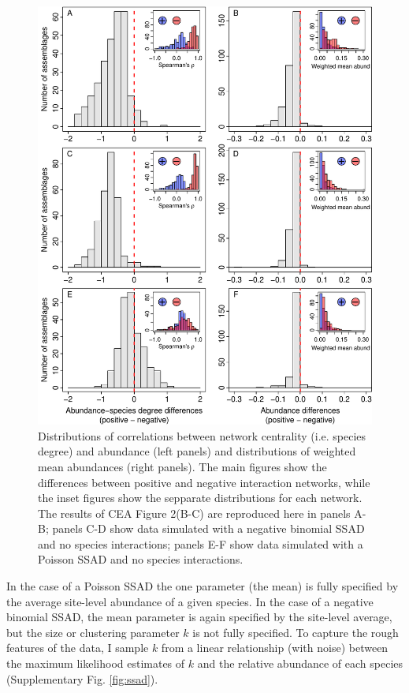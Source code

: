 \documentclass[]{article}
\begin{document}
\begin{figure}

{\centering \includegraphics{RarePlusComMinus_files/figure-latex/fig_plusMinus-1} 

}

\caption{Distributions of correlations between network centrality (i.e. species degree) and abundance (left panels) and distributions of weighted mean abundances (right panels). The main figures show the differences between positive and negative interaction networks, while the inset figures show the sepparate distributions for each network. The results of CEA Figure 2(B-C) are reproduced here in panels A-B; panels C-D show data simulated with a negative binomial SSAD and no species interactions; panels E-F show data simulated with a Poisson SSAD and no species interactions. \label{fig:plusMinus}}\label{fig:fig_plusMinus}
\end{figure}

In the case of a Poisson SSAD the one parameter (the mean) is fully
specified by the average site-level abundance of a given species. In the
case of a negative binomial SSAD, the mean parameter is again specified
by the site-level average, but the size or clustering parameter \(k\) is
not fully specified. To capture the rough features of the data, I sample
\(k\) from a linear relationship (with noise) between the maximum
likelihood estimates of \(k\) and the relative abundance of each species
(Supplementary Fig. \ref{fig:ssad}).
\end{document}
